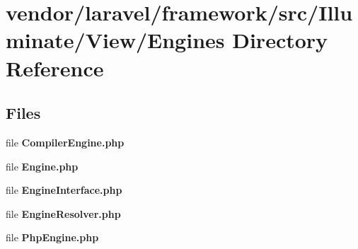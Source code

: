 \section{vendor/laravel/framework/src/\+Illuminate/\+View/\+Engines Directory Reference}
\label{dir_f8136fd271a33075890836421d7e7202}
\subsection*{Files}
\begin{DoxyCompactItemize}
\item 
file {\bf Compiler\+Engine.\+php}
\item 
file {\bf Engine.\+php}
\item 
file {\bf Engine\+Interface.\+php}
\item 
file {\bf Engine\+Resolver.\+php}
\item 
file {\bf Php\+Engine.\+php}
\end{DoxyCompactItemize}
